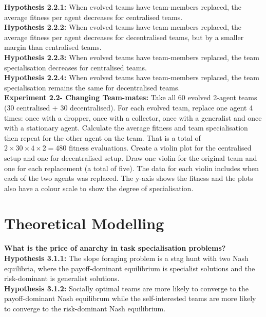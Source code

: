 \documentclass[12pt]{article}
\begin{document}
\textbf{Hypothesis 2.2.1:} When evolved teams have team-members replaced, the average fitness per agent decreases for centralised teams.\\

\textbf{Hypothesis 2.2.2:} When evolved teams have team-members replaced, the average fitness per agent decreases for decentralised teams, but by a smaller margin than centralised teams.\\

\textbf{Hypothesis 2.2.3:} When evolved teams have team-members replaced, the team specialisation decreases for centralised teams.\\

\textbf{Hypothesis 2.2.4:} When evolved teams have team-members replaced, the team specialisation remains the same for decentralised teams.\\

\textbf{Experiment 2.2- Changing Team-mates:} Take all 60 evolved 2-agent teams (30 centralised + 30 decentralised).
For each evolved team, replace one agent 4 times: once with a dropper, once with a collector, once with a generalist and once with a stationary agent.
Calculate the average fitness and team specialisation then repeat for the other agent on the team.
That is a total of $2 \times 30 \times 4 \times 2= 480 \mbox{ fitness evaluations}$. 
Create a violin plot for the centralised setup and one for decentralised setup.
Draw one violin for the original team and one for each replacement (a total of five).
The data for each violin includes when each of the two agents was replaced.
The y-axis shows the fitness and the plots also have a colour scale to show the degree of specialisation.\\

\section{Theoretical Modelling}

\textbf{What is the price of anarchy in task specialisation problems?}\\

\textbf{Hypothesis 3.1.1:} The slope foraging problem is a stag hunt with two Nash equilibria, where the payoff-dominant equilibrium is specialist solutions and the risk-dominant is generalist solutions.\\

\textbf{Hypothesis 3.1.2:} Socially optimal teams are more likely to converge to the payoff-dominant Nash equilibrum while the self-interested teams are more likely to converge to the risk-dominant Nash equilibrium.\\
\end{document}

